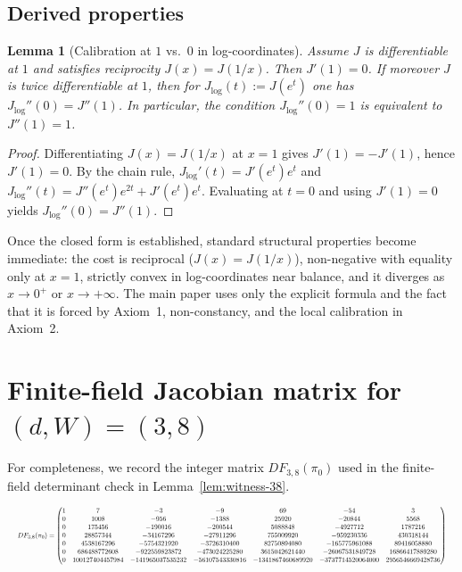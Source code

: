 \documentclass[11pt,reqno]{amsart}
\newtheorem{lemma}[theorem]{Lemma}
\theoremstyle{definition}
\theoremstyle{remark}
\newcommand{\1}{\mathbf{1}}
\begin{document}
\subsection{Derived properties}\label{app:RCL:derived}


\begin{lemma}[Calibration at $1$ vs.\ $0$ in log-coordinates]\label{lem:calibration-equivalence}
Assume $J$ is differentiable at $1$ and satisfies reciprocity $J(x)=J(1/x)$. Then $J'(1)=0$.
If moreover $J$ is twice differentiable at $1$, then for $J_{\log}(t):=J(e^t)$ one has
$J_{\log}''(0)=J''(1)$. In particular, the condition $J_{\log}''(0)=1$ is equivalent to $J''(1)=1$.
\end{lemma}

\begin{proof}
Differentiating $J(x)=J(1/x)$ at $x=1$ gives $J'(1)=-J'(1)$, hence $J'(1)=0$.
By the chain rule, $J_{\log}'(t)=J'(e^t)e^t$ and $J_{\log}''(t)=J''(e^t)e^{2t}+J'(e^t)e^t$.
Evaluating at $t=0$ and using $J'(1)=0$ yields $J_{\log}''(0)=J''(1)$.
\end{proof}



Once the closed form is established, standard structural properties become immediate: the cost is reciprocal ($J(x)=J(1/x)$), non-negative with equality only at $x=1$, strictly convex in log-coordinates near balance, and it diverges as $x\to 0^{+}$ or $x\to+\infty$. The main paper uses only the explicit formula and the fact that it is forced by Axiom~1, non-constancy, and the local calibration in Axiom~2.


\section{\texorpdfstring{Finite-field Jacobian matrix for $(d,W)=(3,8)$}{Finite-field Jacobian matrix for (d,W)=(3,8)}}\label{app:jacobian-38}
For completeness, we record the integer matrix $DF_{3,8}(\pi_0)$ used in the finite-field determinant check in Lemma~\ref{lem:witness-38}.

\[
\resizebox{\textwidth}{!}{$
	DF_{3,8}(\pi_0)=
	\begin{pmatrix}
		1& 7& -3& -9& 69& -54& 3\\
		0& 1008& -956& -1388& 25920& -20844& 5568\\
		0& 175456& -190016& -200544& 5088848& -4927712& 1787216\\
		0& 28857344& -34167296& -27911296& 755009920& -959230336& 430318144\\
		0& 4538167296& -5754321920& -3726310400& 82750894080& -165775961088& 89416058880\\
		0& 686488772608& -922559823872& -473024225280& 3615042621440& -26067531849728& 16866417889280\\
		0& 100127404457984& -141965037535232& -56107543330816& -1341867460689920& -3737714520064000& 2956546669428736
	\end{pmatrix}
	$}
\]
\end{document}
